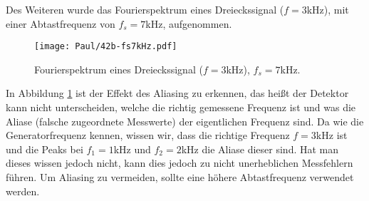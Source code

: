 \newpage
Des Weiteren wurde das Fourierspektrum eines Dreieckssignal ($f = 3$kHz), mit einer Abtastfrequenz von $f_s = 7$kHz, aufgenommen.
\begin{figure}[h]
    \centering
    \texttt{[image: Paul/42b-fs7kHz.pdf]}
    \caption{Fourierspektrum eines Dreieckssignal ($f = 3$kHz), $f_s = 7$kHz.}
    \label{fig:42a3}
\end{figure}

In Abbildung \ref{fig:42a3} ist der Effekt des Aliasing zu erkennen, das heißt der Detektor kann nicht unterscheiden, welche die richtig gemessene Frequenz ist und was die Aliase (falsche zugeordnete Messwerte) der eigentlichen Frequenz sind. Da wie die Generatorfrequenz kennen, wissen wir, dass die richtige Frequenz $f=3$kHz ist und die Peaks bei $f_1=1$kHz und $f_2=2$kHz die Aliase dieser sind. Hat man dieses wissen jedoch nicht, kann dies jedoch zu nicht unerheblichen Messfehlern führen. Um Aliasing zu vermeiden, sollte eine höhere Abtastfrequenz verwendet werden.